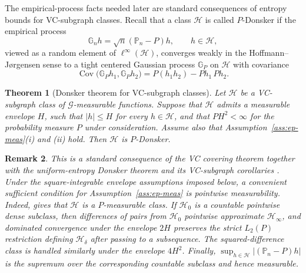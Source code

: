 \documentclass[11pt]{article}
\newtheorem{theorem}{Theorem}[section]
\newtheorem{remark}[theorem]{Remark}
\begin{document}
The empirical-process facts needed later are standard consequences
of entropy bounds for VC-subgraph classes. Recall that a class $\mathcal{H}$
is called $P$-Donsker if the empirical process 
\[
\mathbb{G}_{n}h=\sqrt{n}(\mathbb{P}_{n}-P)h,\qquad h\in\mathcal{H},
\]
viewed as a random element of $\ell^{\infty}(\mathcal{H})$, converges
weakly in the Hoffmann--Jørgensen sense to a tight centered Gaussian
process $\mathbb{G}_{P}$ on $\mathcal{H}$ with covariance 
\[
\operatorname{Cov}\bigl(\mathbb{G}_{P}h_{1},\mathbb{G}_{P}h_{2}\bigr)=P(h_{1}h_{2})-Ph_{1}\,Ph_{2}.
\]

\begin{theorem}[Donsker theorem for VC-subgraph classes]\label{thm:vc-donsker}
Let $\mathcal{H}$ be a VC-subgraph class of $\mathcal{G}$-measurable
functions. Suppose that $\mathcal{H}$ admits
a measurable envelope $H$, such that $\lvert h\rvert\le H$ for every
$h\in\mathcal{H}$, and that $PH^{2}<\infty$ for the probability measure
$P$ under consideration. Assume also that Assumption~\ref{ass:ep-meas}(i) and (ii)
hold. Then $\mathcal{H}$ is $P$-Donsker.
\end{theorem}

\begin{remark}\label{rem:ptwise-meas} This is a standard consequence of the VC covering
theorem \citep[Theorem~2.6.7]{vdVW2023} together with the uniform-entropy
Donsker theorem and its VC-subgraph corollaries \citep[Theorems~2.5.2 and~2.6.8]{vdVW2023}.
Under the square-integrable envelope assumptions imposed below, a
convenient sufficient condition for Assumption~\ref{ass:ep-meas}
is pointwise measurability. Indeed, \citet[Example~2.3.4]{vdVW2023}
gives that $\mathcal{H}$ is a $P$-measurable class. If $\mathcal{H}_{0}$ is a
countable pointwise dense subclass, then differences of pairs from
$\mathcal{H}_{0}$ pointwise approximate $\mathcal{H}_{\infty}$, and
dominated convergence under the envelope $2H$ preserves the strict
$L_{2}(P)$ restriction defining $\mathcal{H}_{\delta}$ after passing
to a subsequence. The squared-difference class is handled similarly
under the envelope $4H^{2}$. Finally, $\sup_{h\in\mathcal{H}}\lvert(\mathbb{P}_{n}-P)h\rvert$
is the supremum over the corresponding countable subclass and hence
measurable.
\end{remark}
\end{document}
